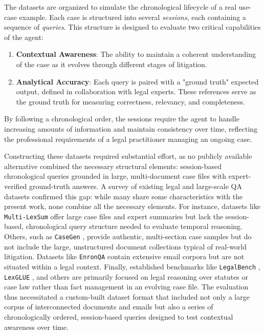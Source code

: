 The datasets are organized to simulate the chronological lifecycle of a real use-case example. Each case is structured into several \textit{sessions}, each containing a sequence of \textit{queries}. This structure is designed to evaluate two critical capabilities of the agent:
\begin{enumerate}
    \item \textbf{Contextual Awareness}: The ability to maintain a coherent understanding of the case as it evolves through different stages of litigation.
    \item \textbf{Analytical Accuracy}: Each query is paired with a "ground truth" expected output, defined in collaboration with legal experts. These references serve as the ground truth for measuring correctness, relevancy, and completeness.
\end{enumerate}

By following a chronological order, the sessions require the agent to handle increasing amounts of information and maintain consistency over time, reflecting the professional requirements of a legal practitioner managing an ongoing case.

Constructing these datasets required substantial effort, as no publicly available alternative combined the necessary structural elements: session-based chronological queries grounded in large, multi-document case files with expert-verified ground-truth answers. A survey of existing legal and large-scale QA datasets confirmed this gap: while many share some characteristics with the present work,
none combine all the necessary elements. For instance, datasets like \texttt{Multi-LexSum} \cite{shen2022multilexsumrealworldsummariescivil} offer large case files and expert summaries but lack the session-based, chronological query structure needed to evaluate temporal reasoning. 
Others, such as \texttt{CaseGen} \cite{li2025casegenbenchmarkmultistagelegal}, provide authentic, multi-section case samples but do not include the large, unstructured document collections typical of real-world litigation. 
Datasets like \texttt{EnronQA} \cite{ryan2025enronqapersonalizedragprivate} contain extensive email corpora but are not situated within a legal context. 
Finally, established benchmarks like \texttt{LegalBench} \cite{guha2023legalbenchcollaborativelybuiltbenchmark}, \texttt{LexGLUE} \cite{chalkidis2022lexgluebenchmarkdatasetlegal}, and others are primarily focused on legal reasoning over statutes 
or case law rather than fact management in an evolving case file. 
The evaluation thus necessitated a custom-built dataset format that included not only a large corpus of interconnected documents and emails but also a series of chronologically ordered, session-based queries designed to test contextual awareness over time.

